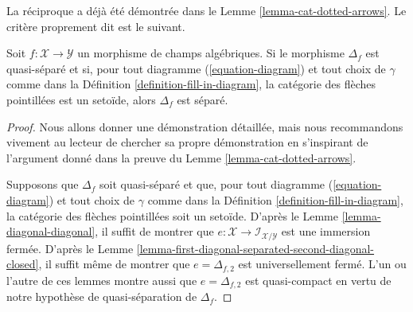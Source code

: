 \noindent
La réciproque a déjà été démontrée dans le
Lemme \ref{lemma-cat-dotted-arrows}.
Le critère proprement dit est le suivant.

\begin{lemma}
\label{lemma-setoids-and-diagonal}
Soit $f : \mathcal{X} \to \mathcal{Y}$ un morphisme de champs algébriques.
Si le morphisme $\Delta_f$ est quasi-séparé et si, pour tout diagramme
(\ref{equation-diagram}) et tout choix de $\gamma$ comme dans la
Définition \ref{definition-fill-in-diagram},
la catégorie des flèches pointillées
est un setoïde, alors $\Delta_f$ est séparé.
\end{lemma}

\begin{proof}
Nous allons donner une démonstration détaillée, mais nous recommandons vivement au
lecteur de chercher sa propre démonstration en s'inspirant de l'argument
donné dans la preuve du Lemme \ref{lemma-cat-dotted-arrows}.

\medskip\noindent
Supposons que $\Delta_f$ soit quasi-séparé et que, pour tout diagramme
(\ref{equation-diagram}) et tout choix de $\gamma$ comme dans la
Définition \ref{definition-fill-in-diagram},
la catégorie des flèches pointillées soit un setoïde.
D'après le Lemme \ref{lemma-diagonal-diagonal}, il suffit de montrer que
$e : \mathcal{X} \to \mathcal{I}_{\mathcal{X}/\mathcal{Y}}$
est une immersion fermée. D'après le
Lemme \ref{lemma-first-diagonal-separated-second-diagonal-closed},
il suffit même de montrer que $e = \Delta_{f, 2}$ est
universellement fermé.
L'un ou l'autre de ces lemmes montre aussi que $e = \Delta_{f, 2}$ est quasi-compact
en vertu de notre hypothèse de quasi-séparation de $\Delta_f$.


\end{proof}
